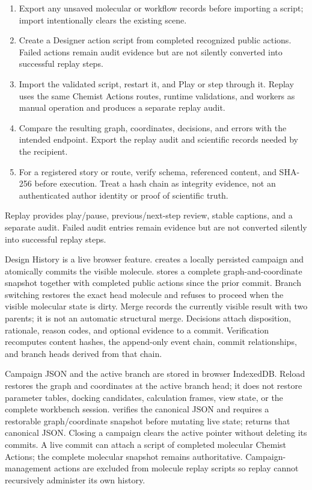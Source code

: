 \begin{enumerate}
\item Export any unsaved molecular or workflow records before importing a script; import intentionally clears the existing scene.
\item Create a Designer action script from completed recognized public actions. Failed actions remain audit evidence but are not silently converted into successful replay steps.
\item Import the validated script, restart it, and Play or step through it. Replay uses the same Chemist Actions routes, runtime validations, and workers as manual operation and produces a separate replay audit.
\item Compare the resulting graph, coordinates, decisions, and errors with the intended endpoint. Export the replay audit and scientific records needed by the recipient.
\item For a registered story or route, verify schema, referenced content, and SHA-256 before execution. Treat a hash chain as integrity evidence, not an authenticated author identity or proof of scientific truth.
\end{enumerate}

Replay provides play/pause, previous/next-step review, stable captions, and a separate audit. Failed audit entries remain evidence but are not converted silently into successful replay steps.


Design History is a live browser feature.  creates a locally persisted campaign and atomically commits the visible molecule.  stores a complete graph-and-coordinate snapshot together with completed public actions since the prior commit. Branch switching restores the exact head molecule and refuses to proceed when the visible molecular state is dirty. Merge records the currently visible result with two parents; it is not an automatic structural merge. Decisions attach disposition, rationale, reason codes, and optional evidence to a commit. Verification recomputes content hashes, the append-only event chain, commit relationships, and branch heads derived from that chain.

Campaign JSON and the active branch are stored in browser IndexedDB. Reload restores the graph and coordinates at the active branch head; it does not restore parameter tables, docking candidates, calculation frames, view state, or the complete workbench session.  verifies the canonical JSON and requires a restorable graph/coordinate snapshot before mutating live state;  returns that canonical JSON. Closing a campaign clears the active pointer without deleting its commits. A live commit can attach a script of completed molecular Chemist Actions; the complete molecular snapshot remains authoritative. Campaign-management actions are excluded from molecule replay scripts so replay cannot recursively administer its own history.

